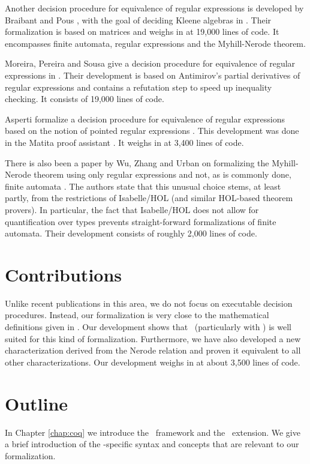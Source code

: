 Another decision procedure for equivalence of regular expressions is developed by Braibant and Pous \cite{DBLP:journals/corr/abs-1105-4537}, with the goal of deciding Kleene algebras in \coq. Their formalization is based on matrices and weighs in at 19,000 lines of code. It encompasses finite automata, regular expressions and the Myhill-Nerode theorem.


Moreira, Pereira and Sousa give a decision procedure for equivalence of regular expressions in \coq \cite{DBLP:conf/RelMiCS/MoreiraPS12}.
Their development is based on Antimirov's partial derivatives of regular expressions \cite{DBLP:journals/tcs/Antimirov96} and contains a refutation step to speed up inequality checking. It consists of 19,000 lines of code.


Asperti formalize a decision procedure for equivalence of regular expressions \cite{DBLP:conf/itp/Asperti12} based on the notion of pointed regular expressions \cite{DBLP:journals/corr/abs-1010-2604}. This development was done in the Matita proof assistant \cite{DBLP:conf/cade/AspertiRCT11}. It weighs in at 3,400 lines of code.


There is also been a paper by Wu, Zhang and Urban on formalizing the Myhill-Nerode theorem using only regular expressions and not, as is commonly done, finite automata \cite{DBLP:conf/itp/WuZU11}.
The authors state that this unusual choice stems, at least partly, from the restrictions of Isabelle/HOL (and similar HOL-based theorem provers). 
In particular, the fact that Isabelle/HOL does not allow for quantification over types prevents straight-forward formalizations of finite automata.
Their development consists of roughly 2,000 lines of code.


\section{Contributions}
Unlike recent publications in this area, we do not focus on executable decision procedures.
    Instead, our formalization is very close to the mathematical definitions given in \cite{DBLP:books/daglib/0088160}.
Our development shows that \coq\ (particularly with \ssreflect) is well suited for this kind of formalization.
Furthermore, we have also developed a new characterization derived from the Nerode relation and proven it equivalent to all other characterizations.
Our development weighs in at about 3,500 lines of code.


\section{Outline}
In Chapter \ref{chap:coq} we introduce the \coq\ framework and the \ssreflect\ extension. 
We give a brief introduction of the \ssreflect-specific syntax and concepts that are relevant to our formalization.

